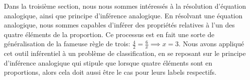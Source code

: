 Dans la troisième section, nous nous sommes intéressés à la résolution
d'équation analogique, ainsi que principe d'inférence analogique. En résolvant
une équation analogique, nous sommes capables d'inférer des propriétés
relatives à l'un des quatre éléments de la proportion. Ce processus est en fait
une sorte de généralisation de la fameuse règle de trois: $\frac{4}{2} =
\frac{6}{x} \implies x =3$. Nous avons appliqué cet outil inférentiel à un
problème de classification, en se reposant sur le principe d'inférence
analogique qui stipule que lorsque quatre éléments sont en proportions, alors
cela doit aussi être le cas pour leurs labels respectifs.
